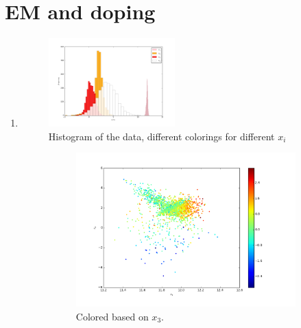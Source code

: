 \documentclass[a4paper,10pt]{article}
\numberwithin{equation}{section} %
\numberwithin{figure}{section} %
\numberwithin{table}{section} %
\theoremstyle{mytheor}
\begin{document}
\section{EM and doping}
\begin{enumerate}
	\item \begin{figure}[h!]
   			\centering
   			\includegraphics[width=0.46\textwidth]{hist_x.png}\vspace{-0.6cm}
   			\caption{\vspace{-0.1cm} Histogram of the data, different colorings for different $x_i$}\vspace{-0.2cm}
  		\end{figure}
		\begin{figure}[h!]
			\centering
			\begin{subfigure}[b]{0.45\textwidth}
				\includegraphics[width=\textwidth]{scatter_x3.png}\vspace{-0.5cm}
				\caption{Colored based on $x_3$.}
			\end{subfigure}
			\begin{subfigure}[b]{0.45\textwidth}

\end{subfigure}
\end{figure}
\end{enumerate}
\end{document}

